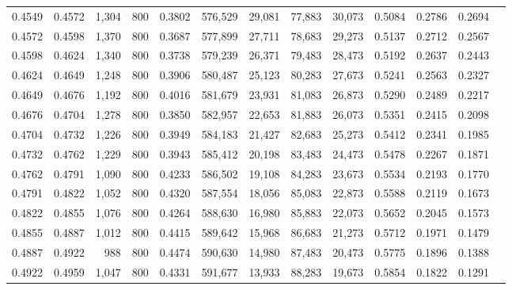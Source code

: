 \begin{tabular}{rrrrrrrrrrrrr}
0.4549 & 0.4572 &  1,304 &   800 &                                     0.3802 & 576,529 &  29,081 &  77,883 &  30,073 & 0.5084 & 0.2786 & 0.2694 \\
0.4572 & 0.4598 &  1,370 &   800 &                                     0.3687 & 577,899 &  27,711 &  78,683 &  29,273 & 0.5137 & 0.2712 & 0.2567 \\
0.4598 & 0.4624 &  1,340 &   800 &                                     0.3738 & 579,239 &  26,371 &  79,483 &  28,473 & 0.5192 & 0.2637 & 0.2443 \\
0.4624 & 0.4649 &  1,248 &   800 &                                     0.3906 & 580,487 &  25,123 &  80,283 &  27,673 & 0.5241 & 0.2563 & 0.2327 \\
0.4649 & 0.4676 &  1,192 &   800 &                                     0.4016 & 581,679 &  23,931 &  81,083 &  26,873 & 0.5290 & 0.2489 & 0.2217 \\
0.4676 & 0.4704 &  1,278 &   800 &                                     0.3850 & 582,957 &  22,653 &  81,883 &  26,073 & 0.5351 & 0.2415 & 0.2098 \\
0.4704 & 0.4732 &  1,226 &   800 &                                     0.3949 & 584,183 &  21,427 &  82,683 &  25,273 & 0.5412 & 0.2341 & 0.1985 \\
0.4732 & 0.4762 &  1,229 &   800 &                                     0.3943 & 585,412 &  20,198 &  83,483 &  24,473 & 0.5478 & 0.2267 & 0.1871 \\
0.4762 & 0.4791 &  1,090 &   800 &                                     0.4233 & 586,502 &  19,108 &  84,283 &  23,673 & 0.5534 & 0.2193 & 0.1770 \\
0.4791 & 0.4822 &  1,052 &   800 &                                     0.4320 & 587,554 &  18,056 &  85,083 &  22,873 & 0.5588 & 0.2119 & 0.1673 \\
0.4822 & 0.4855 &  1,076 &   800 &                                     0.4264 & 588,630 &  16,980 &  85,883 &  22,073 & 0.5652 & 0.2045 & 0.1573 \\
0.4855 & 0.4887 &  1,012 &   800 &                                     0.4415 & 589,642 &  15,968 &  86,683 &  21,273 & 0.5712 & 0.1971 & 0.1479 \\
0.4887 & 0.4922 &    988 &   800 &                                     0.4474 & 590,630 &  14,980 &  87,483 &  20,473 & 0.5775 & 0.1896 & 0.1388 \\
0.4922 & 0.4959 &  1,047 &   800 &                                     0.4331 & 591,677 &  13,933 &  88,283 &  19,673 & 0.5854 & 0.1822 & 0.1291 \\

\end{tabular}

